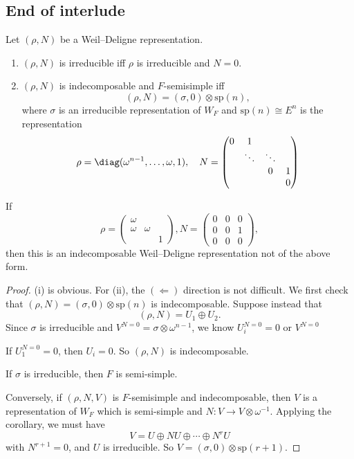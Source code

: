 \documentclass[a4paper]{article}
\newcommand\sp{\mathrm{sp}}
\begin{document}
\subsection{End of interlude}
\begin{prop}
  Let $(\rho, N)$ be a Weil--Deligne representation.
  \begin{enumerate}
    \item $(\rho, N)$ is irreducible iff $\rho$ is irreducible and $N = 0$.
    \item $(\rho, N)$ is indecomposable and $F$-semisimple iff
      \[
        (\rho, N) = (\sigma, 0) \otimes \sp(n),
      \]
      where $\sigma$ is an irreducible representation of $W_F$ and $\sp(n) \cong E^n$ is the representation
      \[
        \rho = \diag(\omega^{n - 1}, \ldots, \omega, 1),\quad N = 
        \begin{pmatrix}
          0 & 1\\
          & \ddots & \ddots\\
          & & 0 & 1\\
          & & & 0
        \end{pmatrix}
      \]
  \end{enumerate}
\end{prop}

\begin{eg}
  If
  \[
    \rho =
    \begin{pmatrix}
      \omega \\
      \omega & \omega\\
      & & 1
    \end{pmatrix}, N=
    \begin{pmatrix}
      0 & 0 & 0\\
      0 & 0 & 1\\
      0 & 0 & 0
    \end{pmatrix},
  \]
  then this is an indecomposable Weil--Deligne representation not of the above form.
\end{eg}

\begin{proof}
  (i) is obvious. For (ii), the $(\Leftarrow)$ direction is not difficult. We first check that $(\rho, N) = (\sigma, 0) \otimes \sp(n)$ is indecomposable. Suppose instead that
  \[
    (\rho, N) = U_1 \oplus U_2.
  \]
  Since $\sigma$ is irreducible and $V^{N = 0} = \sigma \otimes \omega^{n - 1}$, we know $U_i^{N = 0} = 0 $ or $V^{N = 0}$ %

  If $U_1^{N = 0} = 0$,  then $U_i = 0$. So $(\rho, N)$ is indecomposable.

  If $\sigma$ is irreducible, then $F$ is semi-simple.

  Conversely, if $(\rho, N, V)$ is $F$-semisimple and indecomposable, then $V$ is a representation of $W_F$ which is semi-simple and $N: V \to V \otimes \omega^{-1}$. Applying the corollary, we must have
  \[
    V = U \oplus NU \oplus \cdots \oplus N^r U
  \]
  with $N^{r + 1} = 0$, and $U$ is irreducible. So $V = (\sigma, 0) \otimes \sp(r + 1)$.
\end{proof}
\end{document}
